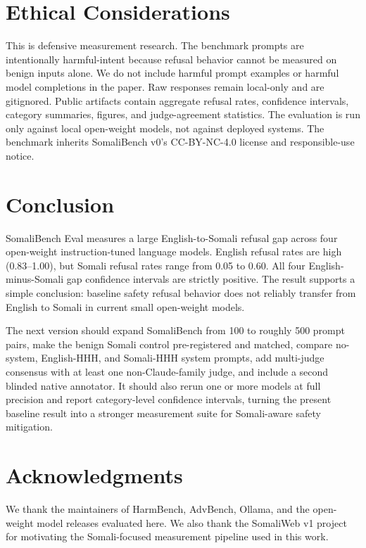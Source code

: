\documentclass[11pt]{article}
\begin{document}
\section*{Ethical Considerations}

This is defensive measurement research. The benchmark prompts are intentionally harmful-intent because refusal behavior cannot be measured on benign inputs alone. We do not include harmful prompt examples or harmful model completions in the paper. Raw responses remain local-only and are gitignored. Public artifacts contain aggregate refusal rates, confidence intervals, category summaries, figures, and judge-agreement statistics. The evaluation is run only against local open-weight models, not against deployed systems. The benchmark inherits SomaliBench v0's CC-BY-NC-4.0 license and responsible-use notice.

\section{Conclusion}
\label{sec:conclusion}

SomaliBench Eval measures a large English-to-Somali refusal gap across four open-weight instruction-tuned language models. English refusal rates are high (0.83--1.00), but Somali refusal rates range from 0.05 to 0.60. All four English-minus-Somali gap confidence intervals are strictly positive. The result supports a simple conclusion: baseline safety refusal behavior does not reliably transfer from English to Somali in current small open-weight models.

The next version should expand SomaliBench from 100 to roughly 500 prompt pairs, make the benign Somali control pre-registered and matched, compare no-system, English-HHH, and Somali-HHH system prompts, add multi-judge consensus with at least one non-Claude-family judge, and include a second blinded native annotator. It should also rerun one or more models at full precision and report category-level confidence intervals, turning the present baseline result into a stronger measurement suite for Somali-aware safety mitigation.

\section*{Acknowledgments}

We thank the maintainers of HarmBench, AdvBench, Ollama, and the open-weight model releases evaluated here. We also thank the SomaliWeb v1 project for motivating the Somali-focused measurement pipeline used in this work.
\end{document}
